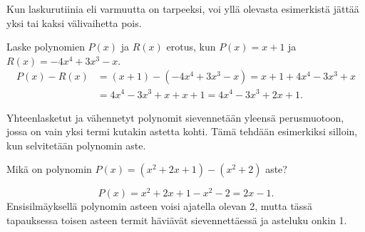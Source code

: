 Kun laskurutiinia eli varmuutta on tarpeeksi, voi yllä olevasta esimerkistä jättää yksi tai kaksi välivaihetta pois.


\begin{esimerkki}
    Laske polynomien $P(x)$ ja $R(x)$ erotus, kun $P(x)=x+1$ ja $R(x)=-4x^4+3x^3-x$.
   \begin{align*}
        P(x)-R(x) & =(x+1)-(-4x^4+3x^3-x) =x+1+4x^4-3x^3+x \\
        & =4x^4-3x^3+x+x+1 = 4x^4-3x^3+2x+1.
    \end{align*}
\end{esimerkki}

Yhteenlasketut ja vähennetyt polynomit sievennetään yleensä perusmuotoon, jossa on vain yksi termi kutakin astetta kohti. Tämä tehdään esimerkiksi silloin, kun selvitetään polynomin aste.

\begin{esimerkki} Mikä on polynomin $P(x)=(x^2+2x+1)-(x^2+2)$ aste?

\[
P(x)=x^2+2x+1-x^2-2=2x-1.
\]
Ensisilmäyksellä polynomin asteen voisi ajatella olevan 2, mutta tässä tapauksessa toisen asteen termit häviävät sievennettäessä ja asteluku onkin 1.
\end{esimerkki}

